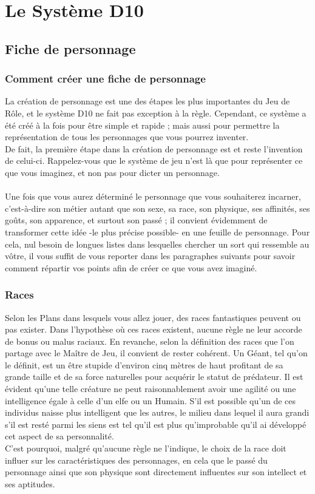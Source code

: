 \chapter{Le Système D10}
\section{Fiche de personnage}
\subsection{Comment créer une fiche de personnage}
La création de personnage est une des étapes les plus importantes du Jeu de Rôle, et le système D10 ne fait pas exception à la règle. Cependant, ce système a été créé à la fois pour être simple et rapide ; mais aussi pour permettre la représentation de tous les personnages que vous pourrez inventer.\\
De fait, la première étape dans la création de personnage est et reste l’invention de celui-ci. Rappelez-vous que le système de jeu n’est là que pour représenter ce que vous imaginez, et non pas pour dicter un personnage.\\
\\
Une fois que vous aurez déterminé le personnage que vous souhaiterez incarner, c’est-à-dire son métier autant que son sexe, sa race, son physique, ses affinités, ses goûts, son apparence, et surtout son passé ; il convient évidemment de transformer cette idée -le plus précise possible- en une feuille de personnage. Pour cela, nul besoin de longues listes dans lesquelles chercher un sort qui ressemble au vôtre, il vous suffit de vous reporter dans les paragraphes suivants pour savoir comment répartir vos points afin de créer ce que vous avez imaginé.
\subsection{Races}
Selon les Plans dans lesquels vous allez jouer, des races fantastiques peuvent ou pas exister. Dans l’hypothèse où ces races existent, aucune règle ne leur accorde de bonus ou malus raciaux. En revanche, selon la définition des races que l’on partage avec le Maître de Jeu, il convient de rester cohérent. Un Géant, tel qu’on le définit, est un être stupide d’environ cinq mètres de haut profitant de sa grande taille et de sa force naturelles pour acquérir le statut de prédateur. Il est évident qu’une telle créature ne peut raisonnablement avoir une agilité ou une intelligence égale à celle d’un elfe ou un Humain. S’il est possible qu’un de ces individus naisse plus intelligent que les autres, le milieu dans lequel il aura grandi s’il est resté parmi les siens est tel qu’il est plus qu’improbable qu’il ai développé cet aspect de sa personnalité.\\
C’est pourquoi, malgré qu’aucune règle ne l’indique, le choix de la race doit influer sur les caractéristiques des personnages, en cela que le passé du personnage ainsi que son physique sont directement influentes sur son intellect et ses aptitudes.
